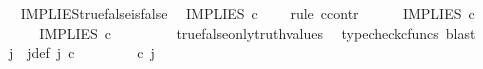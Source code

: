 \begin{isabellebody}
\isamarkupfalse%
%
\endisatagproof
{\isafoldproof}%
%
\isadelimproof
\ \isanewline
%
\endisadelimproof
\isanewline
{}\isamarkupfalse%
\ IMPLIES{\isacharunderscore}{\kern0pt}true{\isacharunderscore}{\kern0pt}false{\isacharunderscore}{\kern0pt}is{\isacharunderscore}{\kern0pt}false{\isacharcolon}{\kern0pt}\isanewline
\ \ {\isachardoublequoteopen}IMPLIES\ {\isasymcirc}\isactrlsub c\ \ {\isasymlangle}{\isasymt}{\isacharcomma}{\kern0pt}{\isasymf}{\isasymrangle}\ {\isacharequal}{\kern0pt}\ {\isasymf}{\isachardoublequoteclose}\isanewline
%
\isadelimproof
%
\endisadelimproof
%
\isatagproof
{}\isamarkupfalse%
{\isacharparenleft}{\kern0pt}rule\ ccontr{\isacharparenright}{\kern0pt}\ \ \isanewline
\ \ \isamarkupfalse%
\ {\isachardoublequoteopen}IMPLIES\ {\isasymcirc}\isactrlsub c\ {\isasymlangle}{\isasymt}{\isacharcomma}{\kern0pt}{\isasymf}{\isasymrangle}\ {\isasymnoteq}\ {\isasymf}{\isachardoublequoteclose}\isanewline
\ \ \isamarkupfalse%
\ \isamarkupfalse%
\ {\isachardoublequoteopen}IMPLIES\ {\isasymcirc}\isactrlsub c\ {\isasymlangle}{\isasymt}{\isacharcomma}{\kern0pt}{\isasymf}{\isasymrangle}\ {\isacharequal}{\kern0pt}\ {\isasymt}{\isachardoublequoteclose}\isanewline
\ \ \ \ \isamarkupfalse%
\ true{\isacharunderscore}{\kern0pt}false{\isacharunderscore}{\kern0pt}only{\isacharunderscore}{\kern0pt}truth{\isacharunderscore}{\kern0pt}values\ \isamarkupfalse%
\ {\isacharparenleft}{\kern0pt}typecheck{\isacharunderscore}{\kern0pt}cfuncs{\isacharcomma}{\kern0pt}\ blast{\isacharparenright}{\kern0pt}\isanewline
\ \ \isamarkupfalse%
\ \isamarkupfalse%
\ j\ \ j{\isacharunderscore}{\kern0pt}def{\isacharcolon}{\kern0pt}\ {\isachardoublequoteopen}j\ {\isasymin}\isactrlsub c\ {\isasymone}{\isasymCoprod}{\isacharparenleft}{\kern0pt}{\isasymone}{\isasymCoprod}{\isasymone}{\isacharparenright}{\kern0pt}\ {\isasymand}\ {\isacharparenleft}{\kern0pt}{\isasymlangle}{\isasymt}{\isacharcomma}{\kern0pt}\ {\isasymt}{\isasymrangle}{\isasymamalg}\ {\isacharparenleft}{\kern0pt}{\isasymlangle}{\isasymf}{\isacharcomma}{\kern0pt}\ {\isasymf}{\isasymrangle}\ {\isasymamalg}{\isasymlangle}{\isasymf}{\isacharcomma}{\kern0pt}\ {\isasymt}{\isasymrangle}{\isacharparenright}{\kern0pt}{\isacharparenright}{\kern0pt}\ {\isasymcirc}\isactrlsub c\ j\ \ {\isacharequal}{\kern0pt}\ {\isasymlangle}{\isasymt}{\isacharcomma}{\kern0pt}{\isasymf}{\isasymrangle}{\isachardoublequoteclose}\isanewline
\ \ \ \ \isamarkupfalse%

\end{isabellebody}
